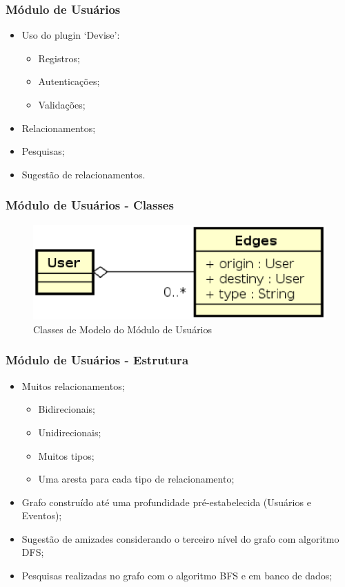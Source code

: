 \documentclass{beamer}
\begin{document}
\begin{frame}
\frametitle{Módulo de Usuários}

\begin{itemize}
	\item Uso do plugin `Devise':
	\begin{itemize}
		\item Registros;
		\item Autenticações;
		\item Validações;
	\end{itemize}
	\item Relacionamentos;
	\item Pesquisas;
	\item Sugestão de relacionamentos.
\end{itemize}

\end{frame}

\begin{frame}
\frametitle{Módulo de Usuários - Classes}

\begin{figure}[!h]
	\centering
	\includegraphics[scale=0.6]{figuras/modulo_usuarios.eps}
	\caption{Classes de Modelo do Módulo de Usuários}
\end{figure}

\end{frame}

\begin{frame}
\frametitle{Módulo de Usuários - Estrutura}

\begin{itemize}
	\item Muitos relacionamentos;
	\begin{itemize}
		\item Bidirecionais;
		\item Unidirecionais;
		\item Muitos tipos;
		\item Uma aresta para cada tipo de relacionamento;
	\end{itemize}
	\item Grafo construído até uma profundidade pré-estabelecida (Usuários e Eventos);
	\item Sugestão de amizades considerando o terceiro nível do grafo com algoritmo DFS;
	\item Pesquisas realizadas no grafo com o algoritmo BFS e em banco de dados;
\end{itemize}

\end{frame}
\end{document}
